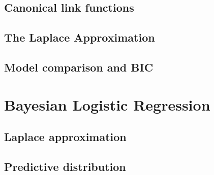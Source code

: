 \subsection{Canonical link functions}

\subsection{The Laplace Approximation}
\subsection{Model comparison and BIC}

\section{Bayesian Logistic Regression}
\subsection{Laplace approximation}
\subsection{Predictive distribution}